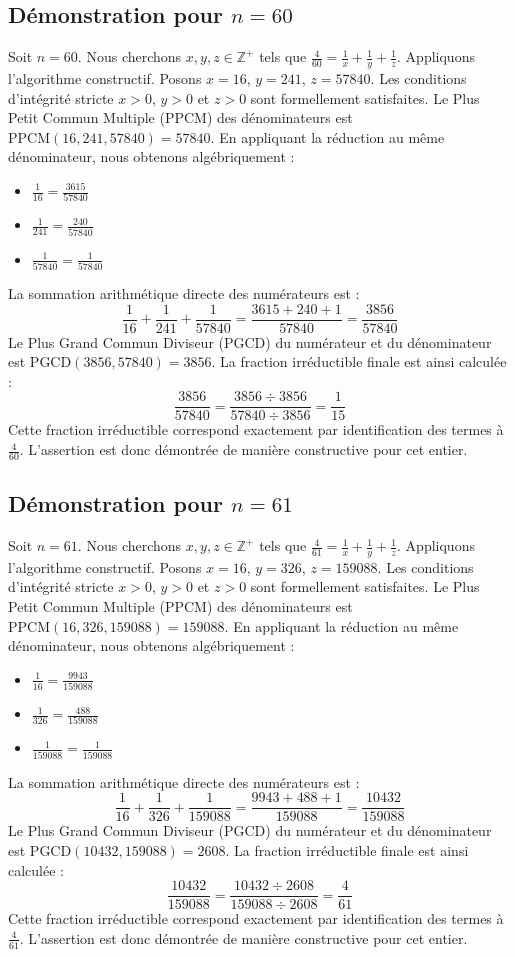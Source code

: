 \documentclass[11pt,a4paper]{article}
\begin{document}
\subsection{Démonstration pour $n = 60$}
Soit $n = 60$. Nous cherchons $x, y, z \in \mathbb{Z}^{+}$ tels que $\frac{4}{60} = \frac{1}{x} + \frac{1}{y} + \frac{1}{z}$.
Appliquons l'algorithme constructif. Posons $x = 16$, $y = 241$, $z = 57840$.
Les conditions d'intégrité stricte $x > 0$, $y > 0$ et $z > 0$ sont formellement satisfaites.
Le Plus Petit Commun Multiple (PPCM) des dénominateurs est $\text{PPCM}(16, 241, 57840) = 57840$.
En appliquant la réduction au même dénominateur, nous obtenons algébriquement :
\begin{itemize}
    \item $\frac{1}{16} = \frac{3615}{57840}$
    \item $\frac{1}{241} = \frac{240}{57840}$
    \item $\frac{1}{57840} = \frac{1}{57840}$
\end{itemize}
La sommation arithmétique directe des numérateurs est :
$$ \frac{1}{16} + \frac{1}{241} + \frac{1}{57840} = \frac{3615 + 240 + 1}{57840} = \frac{3856}{57840} $$
Le Plus Grand Commun Diviseur (PGCD) du numérateur et du dénominateur est $\text{PGCD}(3856, 57840) = 3856$.
La fraction irréductible finale est ainsi calculée :
$$ \frac{3856}{57840} = \frac{3856 \div 3856}{57840 \div 3856} = \frac{1}{15} $$
Cette fraction irréductible correspond exactement par identification des termes à $\frac{4}{60}$. L'assertion est donc démontrée de manière constructive pour cet entier.

\subsection{Démonstration pour $n = 61$}
Soit $n = 61$. Nous cherchons $x, y, z \in \mathbb{Z}^{+}$ tels que $\frac{4}{61} = \frac{1}{x} + \frac{1}{y} + \frac{1}{z}$.
Appliquons l'algorithme constructif. Posons $x = 16$, $y = 326$, $z = 159088$.
Les conditions d'intégrité stricte $x > 0$, $y > 0$ et $z > 0$ sont formellement satisfaites.
Le Plus Petit Commun Multiple (PPCM) des dénominateurs est $\text{PPCM}(16, 326, 159088) = 159088$.
En appliquant la réduction au même dénominateur, nous obtenons algébriquement :
\begin{itemize}
    \item $\frac{1}{16} = \frac{9943}{159088}$
    \item $\frac{1}{326} = \frac{488}{159088}$
    \item $\frac{1}{159088} = \frac{1}{159088}$
\end{itemize}
La sommation arithmétique directe des numérateurs est :
$$ \frac{1}{16} + \frac{1}{326} + \frac{1}{159088} = \frac{9943 + 488 + 1}{159088} = \frac{10432}{159088} $$
Le Plus Grand Commun Diviseur (PGCD) du numérateur et du dénominateur est $\text{PGCD}(10432, 159088) = 2608$.
La fraction irréductible finale est ainsi calculée :
$$ \frac{10432}{159088} = \frac{10432 \div 2608}{159088 \div 2608} = \frac{4}{61} $$
Cette fraction irréductible correspond exactement par identification des termes à $\frac{4}{61}$. L'assertion est donc démontrée de manière constructive pour cet entier.
\end{document}
